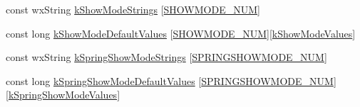 \begin{DoxyCompactItemize}
const wx\-String \hyperlink{a00190_a022c27d9633256775696f727390f8d65}{k\-Show\-Mode\-Strings} \mbox{[}\hyperlink{a00191_acf773163120190d181b9f53d1fa4bb9ca39ab6edfbd568a04aacfb5ae6a43cb12}{S\-H\-O\-W\-M\-O\-D\-E\-\_\-\-N\-U\-M}\mbox{]}
\item 
const long \hyperlink{a00190_a140c52883bc22e49070a982a0a4f8b66}{k\-Show\-Mode\-Default\-Values} \mbox{[}\hyperlink{a00191_acf773163120190d181b9f53d1fa4bb9ca39ab6edfbd568a04aacfb5ae6a43cb12}{S\-H\-O\-W\-M\-O\-D\-E\-\_\-\-N\-U\-M}\mbox{]}\mbox{[}\hyperlink{a00191_a9f04f33b4133efadaca3371489a3e3e0}{k\-Show\-Mode\-Values}\mbox{]}
\item 
const wx\-String \hyperlink{a00190_af0f69d4778ec6c5a8eb06eef348200d8}{k\-Spring\-Show\-Mode\-Strings} \mbox{[}\hyperlink{a00191_ae3fb6f10d83fa2ee9e5cb18156a5b932aaedac2791ff57e50494f873148ddeef3}{S\-P\-R\-I\-N\-G\-S\-H\-O\-W\-M\-O\-D\-E\-\_\-\-N\-U\-M}\mbox{]}
\item 
const long \hyperlink{a00190_a6a349e720aeaf7f48f61d5512bd37daf}{k\-Spring\-Show\-Mode\-Default\-Values} \mbox{[}\hyperlink{a00191_ae3fb6f10d83fa2ee9e5cb18156a5b932aaedac2791ff57e50494f873148ddeef3}{S\-P\-R\-I\-N\-G\-S\-H\-O\-W\-M\-O\-D\-E\-\_\-\-N\-U\-M}\mbox{]}\mbox{[}\hyperlink{a00191_ad4adeccc0bb8604edd3f05ef8e639fcd}{k\-Spring\-Show\-Mode\-Values}\mbox{]}
\end{DoxyCompactItemize}


